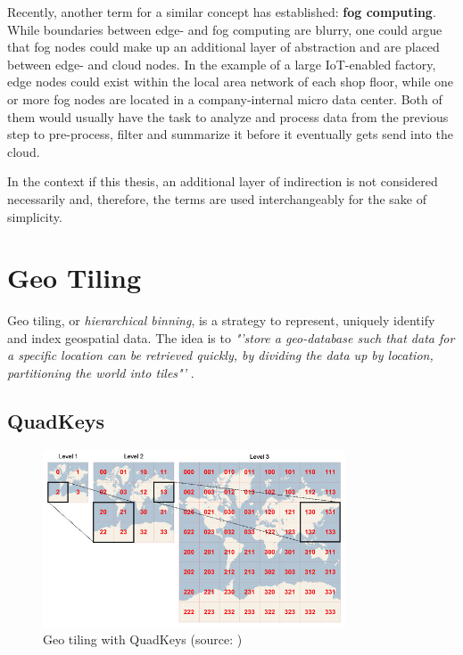Recently, another term for a similar concept has established: \textbf{fog computing}. While boundaries between edge- and fog computing are blurry, one could argue that fog nodes could make up an additional layer of abstraction and are placed between edge- and cloud nodes. In the example of a large IoT-enabled factory, edge nodes could exist within the local area network of each shop floor, while one or more fog nodes are located in a company-internal micro data center. Both of them would usually have the task to analyze and process data from the previous step to pre-process, filter and summarize it before it eventually gets send into the cloud.

In the context if this thesis, an additional layer of indirection is not considered necessarily and, therefore, the terms are used interchangeably for the sake of simplicity. 

\section{Geo Tiling}
\label{sec:background:geo_tiling}
Geo tiling, or \textit{hierarchical binning}, is a strategy to represent, uniquely identify and index geospatial data. The idea is to \textit{"'store a geo-database such that data for a specific location can be retrieved quickly, by dividing the data up by location, partitioning the world into tiles"'} \cite{wiki:quadtiles}. 

\subsection{QuadKeys}
\label{subsec:background:quadkeys}

\begin{figure}[H]
	\centering
	\includegraphics[width=0.8\textwidth]{98_images/quadkeys.jpg}
	\caption{Geo tiling with QuadKeys (source: \cite{wiki:quadtiles})}
	\label{fig:quadkeys}
\end{figure}


